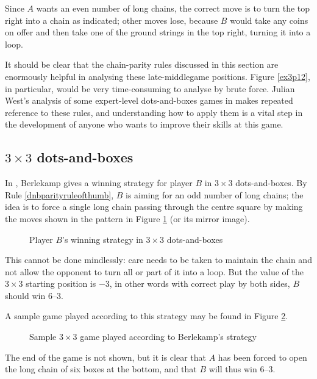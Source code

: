 \documentclass[a4paper,twocolumn]{article}
\begin{document}
Since $A$ wants an even number of long chains, the correct move is to
turn the top right into a chain as indicated; other moves lose,
because $B$ would take any coins on offer and then take one of the
ground strings in the top right, turning it into a loop.

It should be clear that the chain-parity rules discussed in this
section are enormously helpful in analysing these late-middlegame
positions. Figure \ref{ex3p12}, in particular, would be very
time-consuming to analyse by brute force. Julian West's analysis of
some expert-level dots-and-boxes games in \cite{nochance} makes
repeated reference to these rules, and understanding how to apply them
is a vital step in the development of anyone who wants to improve
their skills at this game.

\subsection{$3 \times 3$ dots-and-boxes}

In \cite{berl}, Berlekamp gives a winning strategy for player $B$ in
$3 \times 3$ dots-and-boxes. By Rule \ref{dnbparityruleofthumb}, $B$
is aiming for an odd number of long chains; the idea is to force a
single long chain passing through the centre square by making the
moves shown in the pattern in Figure \ref{3by3strategy} (or its mirror
image).

\begin{figure}
  \centering
  \def\svgscale{0.7}
  
  \caption{Player $B$'s winning strategy in $3 \times 3$ dots-and-boxes}
  \label{3by3strategy}
\end{figure}

This cannot be done mindlessly: care needs to be taken to maintain the
chain and not allow the opponent to turn all or part of it into a
loop. But the value of the $3 \times 3$ starting position is $-3$, in
other words with correct play by both sides, $B$ should win $6$--$3$.

A sample game played according to this strategy may be found in Figure
\ref{3by3samplegame}.

\begin{figure}
  \centering
  \def\svgscale{0.5}
  
  \caption{Sample $3 \times 3$ game played according to Berlekamp's
    strategy}
  \label{3by3samplegame}
\end{figure}

The end of the game is not shown, but it is clear that $A$ has been
forced to open the long chain of six boxes at the bottom, and that $B$
will thus win 6--3.
\end{document}

